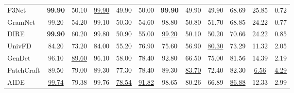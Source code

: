 \begin{table}[!t]
{\begin{tabular}{l|
>{\columncolor[HTML]{EFEFEF}}c| ccccccc|ccc}
F3Net      & \textbf{99.90}                                                               & 50.10                           & \underline{99.90}               & 49.90                    & 50.00                      & \textbf{99.90}                       & 49.90                     & 49.90                       & 68.69                    & 25.85            & 0.72       \\
GramNet    & 99.20                                                               & 54.20                           & 99.10                        & 50.30                    & 54.60                      & 98.80                       & 50.80                     & 51.70                       & 68.85                    & 24.22           & 0.77       \\
DIRE       & \textbf{99.90 }                                                              & 60.20                           & 99.80                        & 50.90                    & 55.00                      & \underline{99.20}                       & 50.10                     & 50.20                       & 70.66                    & 24.22      & 0.85             \\
UnivFD     & 84.20                                                               & 73.20                           & 84.00                        & 55.20                    & 76.90                      & 75.60                       & 56.90                     & \underline{80.30}                       & 73.29                    & 11.32         & 2.05          \\
GenDet     & 96.10                                                               & \underline{89.60}                           & 96.10                        & 58.00                    & 78.40                      & 92.80                       & 66.50                     & 75.00                       & 81.56                    & 14.39         & 2.19          \\
PatchCraft & 89.50                                                               & 79.00                           & 89.30                        & 77.30                    & 78.40                      & 89.30                      & \underline{83.70}                     & 72.40                       & 82.30                     & \underline{6.56}         & \underline{4.29}           \\
AIDE       & 
\underline{99.74}                                                              & 79.38                          & 99.76                       & \underline{78.54}                   & \underline{91.82}                     & 98.65                      & 80.26                    & 66.89                      & \underline{86.88}                    & 12.33            & 2.99       \\

\end{tabular}}
\end{table}
